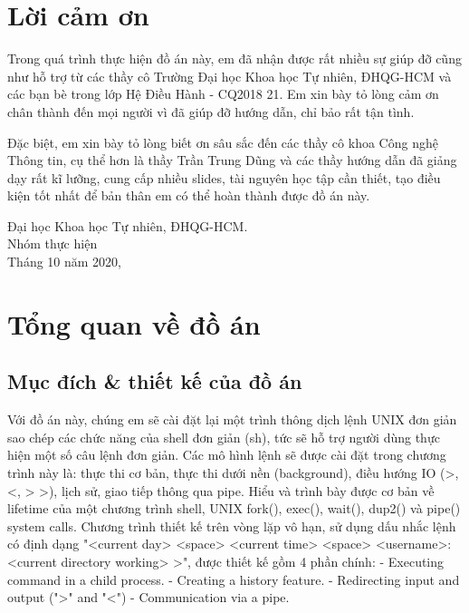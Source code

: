\documentclass{article}
\begin{document}
\section*{Lời cảm ơn}
\vspace{1.0in}
\begingroup
\setlength{\parindent}{0pt}
Trong quá trình thực hiện đồ án này, em đã nhận được rất nhiều sự giúp đỡ cũng như hỗ trợ từ các thầy cô Trường Đại học Khoa học Tự nhiên, ĐHQG-HCM và các bạn bè trong lớp Hệ Điều Hành - CQ2018 21. Em xin bày tỏ lòng cảm ơn chân thành đến mọi người vì đã giúp đỡ hướng dẫn, chỉ bảo rất tận tình.

Đặc biệt, em xin bày tỏ lòng biết ơn sâu sắc đến các thầy cô khoa Công nghệ Thông tin, cụ thể hơn là thầy Trần Trung Dũng và các thầy hướng dẫn đã giảng dạy rất kĩ lưỡng, cung cấp nhiều slides, tài nguyên học tập cần thiết, tạo điều kiện tốt nhất để bản thân em có thể hoàn thành được đồ án này.

\par


{Đại học Khoa học Tự nhiên, ĐHQG-HCM.}\\
Nhóm thực hiện\\
Tháng 10 năm 2020,\\
\endgroup
\newpage
\tableofcontents
\newpage
{} %

\section{Tổng quan về đồ án}

\subsection{Mục đích & thiết kế của đồ án}

Với đồ án này, chúng em sẽ cài đặt lại một trình thông dịch lệnh UNIX đơn giản sao chép các chức năng của shell đơn giản (sh), tức sẽ hỗ trợ người dùng thực hiện một số câu lệnh đơn giản.\newline
Các mô hình lệnh sẽ được cài đặt trong chương trình này là: thực thi cơ bản, thực thi dưới nền (background), điều hướng IO (>, <, > >), lịch sử, giao tiếp thông qua pipe. \newline
Hiểu và trình bày được cơ bản về lifetime của một chương trình shell, UNIX fork(), exec(), wait(), dup2() và pipe() system calls.\newline
Chương trình thiết kế trên vòng lặp vô hạn, sử dụng dấu nhắc lệnh có định dạng "<current day> <space> <current time> <space> <username>:<current directory working> >", được thiết kế gồm 4 phần chính:\newline
-	Executing command in a child process.\newline
-	Creating a history feature.\newline
-	Redirecting input and output (">" and  "<")\newline
-	Communication via a pipe.\newline
\end{document}

